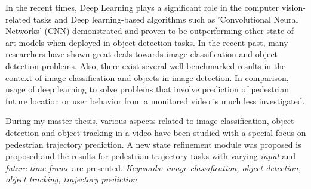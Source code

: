 % 
% 
%


In the recent times, Deep Learning plays a significant role in the computer vision-related tasks and Deep learning-based algorithms such as 'Convolutional Neural Networks'
(CNN) demonstrated and proven to be outperforming other state-of-art models when 
deployed in object detection tasks. In the recent past, many researchers have shown great 
deals towards image classification and object detection problems. Also, there exist several 
well-benchmarked results in the context of image classification and objects in image detection.
In comparison, usage of deep learning to solve problems that involve prediction of pedestrian future location or user behavior from a monitored video is much less investigated.

\vspace{1em}
\noindent During my master thesis, various aspects related to image classification, object 
detection and object tracking in a video have been studied with a special focus on pedestrian trajectory prediction. 
A new state refinement module was proposed is proposed and the results for pedestrian trajectory 
tasks with varying \textit{input} and \textit{future-time-frame} are presented.
\baselineskip
\textit{Keywords: image classification, object detection, object tracking, trajectory prediction}
